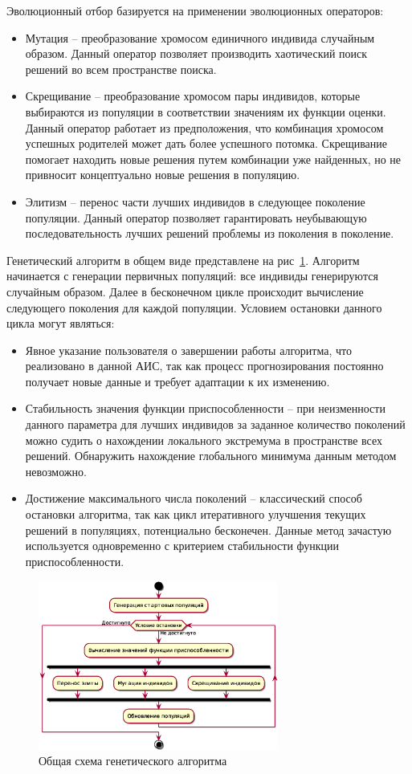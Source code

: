 Эволюционный отбор базируется на применении эволюционных операторов:
\begin{itemize}
\item Мутация -- преобразование хромосом единичного индивида случайным образом. Данный оператор позволяет производить хаотический поиск решений во всем пространстве поиска.
\item Скрещивание -- преобразование хромосом пары индивидов, которые выбираются из популяции в соответствии значениям их функции оценки. Данный оператор работает из предположения, что комбинация хромосом успешных родителей может дать более успешного потомка. Скрещивание помогает находить новые решения путем комбинации уже найденных, но не привносит концептуально новые решения в популяцию.
\item Элитизм -- перенос части лучших индивидов в следующее поколение популяции. Данный оператор позволяет гарантировать неубывающую последовательность лучших решений проблемы из поколения в поколение.
\end{itemize}

Генетический алгоритм в общем виде представлене на рис~\ref{figure:genetics}. Алгоритм начинается с генерации первичных популяций: все индивиды генерируются случайным образом. Далее в бесконечном цикле происходит вычисление следующего поколения для каждой популяции. Условием остановки данного цикла могут являться:
\begin{itemize}
\item Явное указание пользователя о завершении работы алгоритма, что реализовано в данной АИС, так как процесс прогнозирования постоянно получает новые данные и требует адаптации к их изменению.
\item Стабильность значения функции приспособленности -- при неизменности данного параметра для лучших индивидов за заданное количество поколений можно судить о нахождении локального экстремума в пространстве всех решений. Обнаружить нахождение глобального минимума данным методом невозможно.
\item Достижение максимального числа поколений -- классический способ остановки алгоритма, так как цикл итеративного улучшения текущих решений в популяциях, потенциально бесконечен. Данные метод зачастую используется одновременно с критерием стабильности функции приспособленности.
\end{itemize}

\begin{figure}[h!]
\centering
\includegraphics[width=0.7\textwidth]{science/genetic}
\caption{Общая схема генетического алгоритма}
\label{figure:genetics}
\end{figure}

